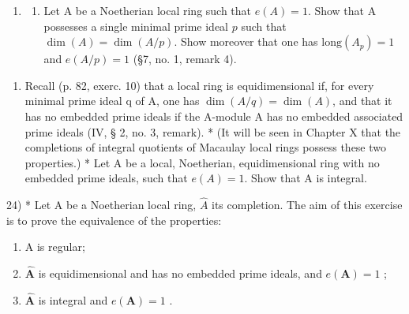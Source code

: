 \begin{enumerate}
\def\labelenumi{\arabic{enumi})}
\setcounter{enumi}{22}
\tightlist
\item
  \begin{enumerate}
  \def\labelenumii{\alph{enumii})}
  \tightlist
  \item
    Let A be a Noetherian local ring such that \(e(A) = 1\). Show that A possesses a single minimal prime ideal \(p\) such that \(\dim(A) = \dim(A/p)\). Show moreover that one has \(\text{long}(A_p) = 1\) and \(e(A/p) = 1\) (\S 7, no. 1, remark 4).
  \end{enumerate}
\end{enumerate}

\begin{enumerate}
\def\labelenumi{\alph{enumi})}
\setcounter{enumi}{1}
\tightlist
\item
  Recall (p. 82, exerc. 10) that a local ring is equidimensional if, for every minimal prime ideal q of A, one has \(\dim(A/q) = \dim(A)\), and that it has no embedded prime ideals if the A-module A has no embedded associated prime ideals (IV, § 2, no. 3, remark). * (It will be seen in Chapter X that the completions of integral quotients of Macaulay local rings possess these two properties.) * Let A be a local, Noetherian, equidimensional ring with no embedded prime ideals, such that \(e(A) = 1\). Show that A is integral.
\end{enumerate}

24) * Let A be a Noetherian local ring, \(\widehat{A}\) its completion. The aim of this exercise is to prove the equivalence of the properties:

\begin{enumerate}
\def\labelenumi{(\roman{enumi})}
\item
  A is regular;
\item
  \(\hat{\mathbf{A}}\) is equidimensional and has no embedded prime ideals, and \(e(\mathbf{A}) = 1\) ;
\item
  \(\hat{\mathbf{A}}\) is integral and \(e(\mathbf{A}) = 1\) .
\end{enumerate}

